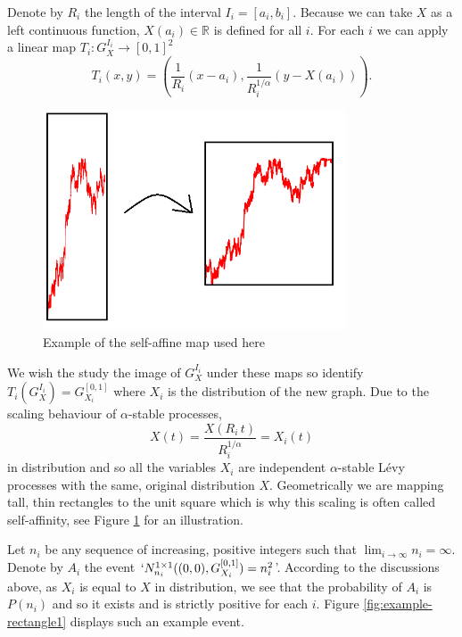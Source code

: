 Denote by $R_i$ the length of the interval $I_i=[a_i,b_i]$. Because we can take $X$ as a left continuous function, $X(a_i)\in\mathbb{R}$ is defined for all $i$. For each $i$ we can apply a linear map $T_i: G_X^{I_i} \rightarrow [0,1]^2$
\[
T_i(x,y)=\left(\frac{1}{R_i}(x-a_i),\frac{1}{R_i^{1/\alpha}}\left(y-X(a_i)\right)\right).
\]

\begin{figure}[h]
    \centering
    \includegraphics[width=0.8\textwidth]{pics/ch-brownian/memes-map.png}
    \caption{Example of the self-affine map used here}
    \label{fig:rectangles-graph}
\end{figure}

We wish the study the image of $G_X^{I_i}$ under these maps so identify $T_i(G_X^{I_i})=G_{X_i}^{[0,1]}$ where $X_i$ is the distribution of the new graph. Due to the scaling behaviour of $\alpha$-stable processes, 
\[
X(t) = \frac{X(R_i\, t)}{R_i^{1/\alpha}} = X_i(t)
\]
in distribution and so all the variables $X_i$ are independent $\alpha$-stable L\'evy processes with the same, original distribution $X$. Geometrically we are mapping tall, thin rectangles to the unit square which is why this scaling is often called self-affinity, see Figure \ref{fig:rectangles-graph} for an illustration. 

Let $n_i$ be any sequence of increasing, positive integers such that $\lim_{i\to\infty} n_i=\infty$. Denote by $A_i$ the event $`N_{n_i}^{1 \times 1 }((0,0),G_{X_i}^{[0,1]})=n_i^2 $'. According to the discussions above, as $X_i$ is equal to $X$ in distribution, we see that the probability of $A_i$ is $P(n_i)$ and so it exists and is strictly positive for each $i$. Figure \ref{fig:example-rectangle1} displays such an example event. 

